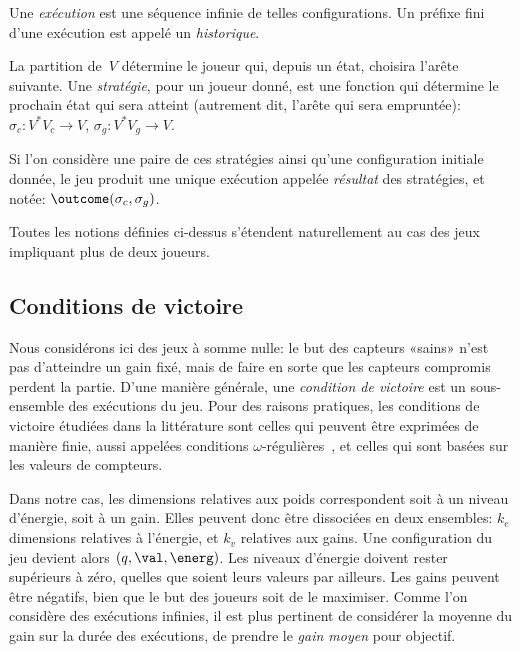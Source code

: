 Une \emph{exécution} est une séquence infinie de telles configurations.
Un préfixe fini d'une exécution est appelé un \emph{historique}.

La partition de~$V$ détermine le joueur qui, depuis un état, choisira l'arête suivante.
Une \emph{stratégie}, pour un joueur donné, est une fonction qui détermine le prochain état qui sera atteint (autrement dit, l'arête qui sera empruntée): $\sigma_c: V^* V_c \rightarrow V$, $\sigma_g: V^* V_g \rightarrow V$.

Si l'on considère une paire de ces stratégies ainsi qu'une configuration initiale donnée, le jeu produit une unique exécution appelée \emph{résultat} des stratégies, et notée: $\outcome(\sigma_c,\sigma_g)$.

\begin{remark}
Toutes les notions définies ci-dessus s'étendent naturellement au cas des jeux impliquant plus de deux joueurs.
\end{remark}

\subsection{Conditions de victoire}

Nous considérons ici des jeux à somme nulle: le but des capteurs «sains» n'est pas d'atteindre un gain fixé, mais de faire en sorte que les capteurs compromis perdent la partie.
D'une manière générale, une \emph{condition de victoire} est un sous-ensemble des exécutions du jeu.
Pour des raisons pratiques, les conditions de victoire étudiées dans la littérature sont celles qui peuvent être exprimées de manière finie, aussi appelées conditions $\omega$-régulières~\cite{GTW02}, et celles qui sont basées sur les valeurs de compteurs.

Dans notre cas, les dimensions relatives aux poids correspondent soit à un niveau d'énergie, soit à un gain.
Elles peuvent donc être dissociées en deux ensembles: $k_e$ dimensions relatives à l'énergie, et $k_v$ relatives aux gains.
Une configuration du jeu devient alors $(q,\val,\energ)$.
Les niveaux d'énergie doivent rester supérieurs à zéro, quelles que soient leurs valeurs par ailleurs.
Les gains peuvent être négatifs, bien que le but des joueurs soit de le maximiser.
Comme l'on considère des exécutions infinies, il est plus pertinent de considérer la moyenne du gain sur la durée des exécutions, \cad de prendre le \emph{gain moyen} pour objectif.

